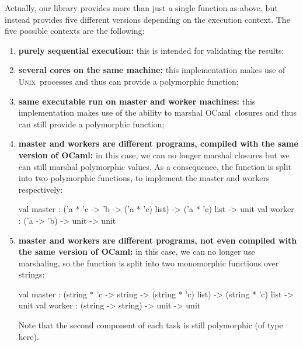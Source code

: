 \documentclass[preprint]{sigplanconf}
\newcommand{\Ocaml}{OCaml}
\newcommand{\unix}{\textsc{Unix}}
\begin{document}
Actually, our library provides more than just a single 
function as above, but instead provides five different versions
depending on the execution context. The five possible contexts are the
following: 
\begin{enumerate}
\item \textbf{purely sequential execution:}
  this is intended for validating the results;

\item \textbf{several cores on the same machine:} 
  this implementation makes use of \unix\ processes and thus can
  provide a polymorphic  function;

\item \textbf{same executable run on master and worker machines:}
  this implementation makes use of the ability to marshal \Ocaml\
  closures and thus can still provide a polymorphic  function;

\item \textbf{master and workers are different programs, compiled with
    the same version of \Ocaml:} 
  in this case, we can no longer marshal closures but we can still
  marshal polymorphic values. As a consequence, 
  the  function is split into two
  polymorphic functions, to implement the master and workers respectively:
  \begin{ocaml}
val master : 
  ('a * 'c -> 'b -> ('a * 'c) list) -> 
  ('a * 'c) list -> unit
val worker : ('a -> 'b) -> unit -> unit
  \end{ocaml}

\item \textbf{master and workers are different programs, not even
    compiled with the same version of \Ocaml:} in this case, we can no
  longer use marshaling, so the
   function is split into two monomorphic functions
  over strings: 
  \begin{ocaml}
val master : 
  (string * 'c -> string -> (string * 'c) list) -> 
  (string * 'c) list -> unit
val worker : (string -> string) -> unit -> unit
  \end{ocaml}
  Note that the second component of each task is still polymorphic (of
  type \ocaml{'c} here).
\end{enumerate}
\end{document}
